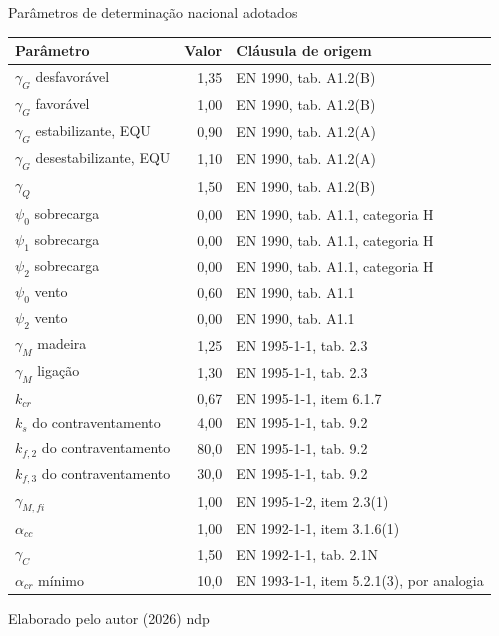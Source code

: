 \tabela
{Parâmetros de determinação nacional adotados}
{\scriptsize
\begin{tabular}{lrl}
\toprule
    \textbf{Parâmetro} & \textbf{Valor} & \textbf{Cláusula de origem} \\
\midrule
    $\gamma_G$ desfavorável & 1,35 & EN 1990, tab. A1.2(B) \\
    $\gamma_G$ favorável & 1,00 & EN 1990, tab. A1.2(B) \\
    $\gamma_G$ estabilizante, EQU & 0,90 & EN 1990, tab. A1.2(A) \\
    $\gamma_G$ desestabilizante, EQU & 1,10 & EN 1990, tab. A1.2(A) \\
    $\gamma_Q$ & 1,50 & EN 1990, tab. A1.2(B) \\
    $\psi_0$ sobrecarga & 0,00 & EN 1990, tab. A1.1, categoria H \\
    $\psi_1$ sobrecarga & 0,00 & EN 1990, tab. A1.1, categoria H \\
    $\psi_2$ sobrecarga & 0,00 & EN 1990, tab. A1.1, categoria H \\
    $\psi_0$ vento & 0,60 & EN 1990, tab. A1.1 \\
    $\psi_2$ vento & 0,00 & EN 1990, tab. A1.1 \\
    $\gamma_M$ madeira & 1,25 & EN 1995-1-1, tab. 2.3 \\
    $\gamma_M$ ligação & 1,30 & EN 1995-1-1, tab. 2.3 \\
    $k_{cr}$ & 0,67 & EN 1995-1-1, item 6.1.7 \\
    $k_s$ do contraventamento & 4,00 & EN 1995-1-1, tab. 9.2 \\
    $k_{f,2}$ do contraventamento & 80,0 & EN 1995-1-1, tab. 9.2 \\
    $k_{f,3}$ do contraventamento & 30,0 & EN 1995-1-1, tab. 9.2 \\
    $\gamma_{M,fi}$ & 1,00 & EN 1995-1-2, item 2.3(1) \\
    $\alpha_{cc}$ & 1,00 & EN 1992-1-1, item 3.1.6(1) \\
    $\gamma_C$ & 1,50 & EN 1992-1-1, tab. 2.1N \\
    $\alpha_{cr}$ mínimo & 10,0 & EN 1993-1-1, item 5.2.1(3), por analogia \\
\bottomrule
\end{tabular}}
{Elaborado pelo autor (2026)}
{ndp}
{}
{}
